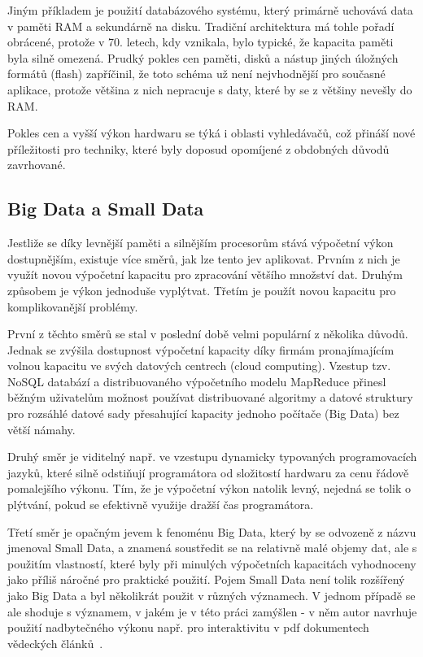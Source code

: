 \documentclass[11pt,letterpaper,oneside,openright]{book}
\begin{document}
Jiným příkladem je použití databázového systému, který primárně uchovává data v
paměti RAM a sekundárně na disku. Tradiční architektura má tohle pořadí
obrácené, protože v 70. letech, kdy vznikala, bylo typické, že kapacita paměti
byla silně omezená. Prudký pokles cen paměti, disků a nástup jiných úložných
formátů (flash) zapříčinil, že toto schéma už není nejvhodnější pro současné
aplikace, protože většina z nich nepracuje s daty, které by se z většiny
nevešly do RAM.

Pokles cen a vyšší výkon hardwaru se týká i oblasti vyhledávačů, což přináší
nové příležitosti pro techniky, které byly doposud opomíjené z obdobných důvodů
zavrhované.

\subsection{Big Data a Small Data}
Jestliže se díky levnější paměti a silnějším procesorům stává výpočetní výkon
dostupnějším, existuje více směrů, jak lze tento jev aplikovat. Prvním z nich
je využít novou výpočetní kapacitu pro zpracování většího množství dat. Druhým
způsobem je výkon jednoduše vyplýtvat. Třetím je použít novou kapacitu pro
komplikovanější problémy.

První z těchto směrů se stal v poslední době velmi populární z několika důvodů.
Jednak se zvýšila dostupnost výpočetní kapacity díky firmám pronajímajícím
volnou kapacitu ve svých datových centrech (cloud computing). Vzestup tzv.
NoSQL databází a distribuovaného výpočetního modelu MapReduce přinesl běžným
uživatelům možnost používat distribuované algoritmy a datové struktury pro
rozsáhlé datové sady přesahující kapacity jednoho počítače (Big Data) bez větší
námahy.

Druhý směr je viditelný např. ve vzestupu dynamicky typovaných programovacích
jazyků, které silně odstiňují programátora od složitostí hardwaru za cenu
řádově pomalejšího výkonu. Tím, že je výpočetní výkon natolik levný, nejedná se
tolik o plýtvání, pokud se efektivně využije dražší čas programátora.

Třetí směr je opačným jevem k fenoménu Big Data, který by se odvozeně z názvu
jmenoval Small Data, a znamená soustředit se na relativně malé objemy dat, ale
s použitím vlastností, které byly při minulých výpočetních kapacitách
vyhodnoceny jako příliš náročné pro praktické použití. Pojem Small Data není
tolik rozšířený jako Big Data a byl několikrát použit v různých významech. V
jednom případě se ale shoduje s významem, v jakém je v této práci zamýšlen - v
něm autor navrhuje použití nadbytečného výkonu např. pro interaktivitu v pdf
dokumentech vědeckých článků~\cite{small_data}.
\end{document}
